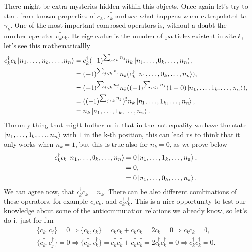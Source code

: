 There might be extra mysteries hidden within this objects. Once again let's try to start from known properties of $c_k$, $c^\dagger_k$ and see what happens when extrapolated to $\gamma_k$. One of the most important composed operators is, without a doubt the number operator $c_k^\dagger c_k$. Its eigenvalue is the number of particles existent in site $k$, let's see this mathematicallly
\begin{equation*}
    \begin{aligned}
    c_k^\dagger c_k \ket{n_1,\ldots,n_k,\ldots,n_n} &= c_k^\dagger (-1)^{\sum_{j<k}n_j} n_k \ket{n_1,\ldots,0_k,\ldots,n_n},\\
    &=  (-1)^{\sum_{j<k}n_j} n_k (c_k^\dagger \ket{n_1,\ldots,0_k,\ldots,n_n}),\\
    &=  (-1)^{\sum_{j<k}n_j} n_k ((-1)^{\sum_{j<k}n_j} (1-0) \ket{n_1,\ldots,1_k,\ldots,n_n}),\\
    &=  ((-1)^{\sum_{j<k}n_j})^2 n_k \ket{n_1,\ldots,1_k,\ldots,n_n},\\
    &= n_k \ket{n_1,\ldots,1_k,\ldots,n_n}.
    \end{aligned}
\end{equation*}
The only thing that might bother us is that in the last equality we have the state $\ket{n_1,\ldots,1_k,\ldots,n_n}$ with $1$ in the k-th position, this can lead us to think that it only works when $n_k=1$, but this is true also for $n_k=0$, as we prove below
\begin{equation*}
    \begin{aligned}
    c_k^\dagger c_k \ket{n_1,\ldots,0_k,\ldots,n_n}  &= 0 \ket{n_1,\ldots,1_k,\ldots,n_n},\\
    &= 0 ,\\
    &= 0 \ket{n_1,\ldots,0_k,\ldots,n_n}.
    \end{aligned}
\end{equation*}
We can agree now, that $c_k^\dagger c_k = n_k$. There can be also different combinations of these operators, for example $c_kc_k$, and $c_k^\dagger c_k^\dagger$. This is a nice opportunity to test our knowledge about some of the anticommutation relations we already know, so let's do it just for fun
\begin{eqnarray}
    \{c_k,c_j\} = 0 \Rightarrow \{c_k,c_k\} = c_kc_k + c_kc_k = 2c_k = 0 \Rightarrow c_kc_k = 0,\nonumber\\
    \{c_k^\dagger, c_j^\dagger\} = 0 \Rightarrow  \{c_k^\dagger,c_k^\dagger\} = c_k^\dagger c_k^\dagger + c_k^\dagger c_k^\dagger = 2c_k^\dagger c_k^\dagger =0 \Rightarrow c_k^\dagger c_k^\dagger =0. \nonumber
\end{eqnarray}

